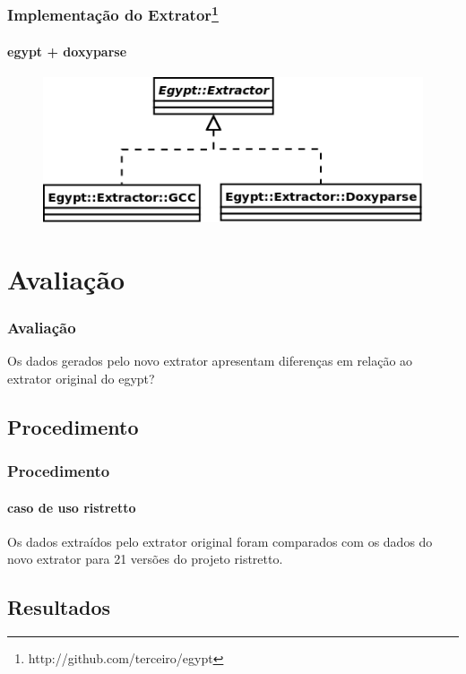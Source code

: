 \documentclass{beamer}
\begin{document}
\begin{frame}
\frametitle{Implementação do Extrator\footnote{http://github.com/terceiro/egypt}}
\framesubtitle{egypt + doxyparse}
 \begin{figure}[h]
 \center
 \includegraphics[scale=0.3]{imagens/egypt-diagram-extractor}
 \label{egypt-diagram-extractor}
 \end{figure}
\end{frame}

\section{Avaliação}

\begin{frame}
\frametitle{Avaliação}
 Os dados gerados pelo novo extrator apresentam diferenças em relação ao
 extrator original do egypt?
\end{frame}

\subsection{Procedimento}

\begin{frame}
\frametitle{Procedimento}
\framesubtitle{caso de uso ristretto}
 Os dados extraídos pelo extrator original foram comparados com os dados do
 novo extrator para 21 versões do projeto ristretto.
\end{frame}

\subsection{Resultados}
\end{document}
